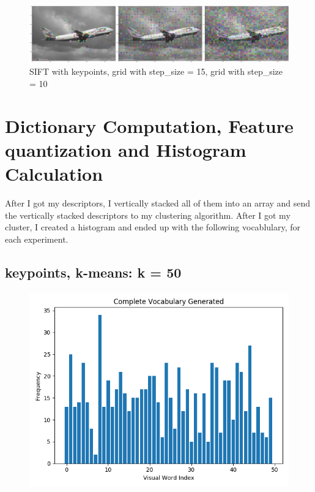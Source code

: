 \begin{figure}[H]
    \centering
    \includegraphics[width=\textwidth]{images/ext-desc.png}
    \caption*{SIFT with keypoints, grid with step\_size = 15, grid with step\_size = 10}
    \setlength{\belowcaptionskip}{-20pt}
    \setlength{\abovecaptionskip}{-20pt}
\end{figure}


\section*{Dictionary Computation, Feature quantization and Histogram Calculation}

After I got my descriptors, I vertically stacked all of them into an array and
send the vertically stacked descriptors to my clustering algorithm. After I got
my cluster, I created a histogram and ended up with the following vocablulary,
for each experiment.

\subsection*{keypoints, k-means: k = 50}
\begin{figure}[H]
    \centering
    \includegraphics[width=\textwidth]{images/bow-kp-50.png}
\end{figure}

